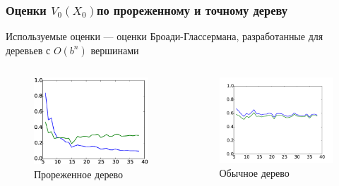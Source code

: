 \documentclass[unicode, notheorems]{beamer}
\begin{document}
\begin{frame}\frametitle{Оценки $V_0(X_0)$по прореженному и точному дереву}
    Используемые оценки --- оценки Броади-Глассермана, разработанные для деревьев с $O(b^n)$ вершинами
    \begin{columns}
        \begin{column}{0.5\textwidth}
            \begin{figure}
                \centering
                \includegraphics[width=\linewidth]{true_value_test_empiric_distr}
                \caption{Прореженное дерево}
                \label{fig:true_value_test_empiric_distrib}
            \end{figure}
        \end{column}
        \begin{column}{0.5\textwidth}
            \begin{figure}
                \centering
                \includegraphics[width=\linewidth]{true_value_test_standard.pdf}
                \caption{Обычное дерево}
                \label{fig:true_value_test_standard}
            \end{figure}
    \end{column}
\end{columns}
\end{frame}
\end{document}
